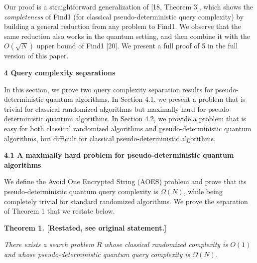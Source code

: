 



Our proof is a straightforward generalization of [18, Theorem 3], which shows the \emph{completeness} of Find1 (for classical pseudo-deterministic query complexity) by building a general reduction from any problem to Find1. We observe that the same reduction also works in the quantum setting, and then combine it with the $O(\sqrt{N})$ upper bound of Find1 [20]. We present a full proof of 5 in the full version of this paper.\par






\par\medskip\noindent\textbf{
4 Query complexity separations}\par




In this section, we prove two query complexity separation results for pseudo-deterministic quantum algorithms.
In Section 4.1, we present a problem that is trivial for classical randomized algorithms but maximally hard for pseudo-deterministic quantum algorithms.
In Section 4.2, we provide a problem that is easy for both classical randomized algorithms and pseudo-deterministic quantum algorithms, but difficult for classical pseudo-deterministic algorithms.\par




\par\medskip\noindent\textbf{
4.1 A maximally hard problem for pseudo-deterministic quantum algorithms}\par




We define the Avoid One Encrypted String (AOES) problem and prove that its pseudo-deterministic quantum query complexity is $\Omega(N)$, while being completely trivial for standard randomized algorithms. We prove the separation of Theorem 1 that we restate below.\par






\par\medskip\noindent\textbf{
\textbf{Theorem 1}\textbf{.}
[Restated, see original statement.]}\par



\emph{There exists a search problem ${R}$ whose classical randomized complexity is $O(1)$ and whose pseudo-deterministic quantum query complexity is $\Omega(N)$.}\par



